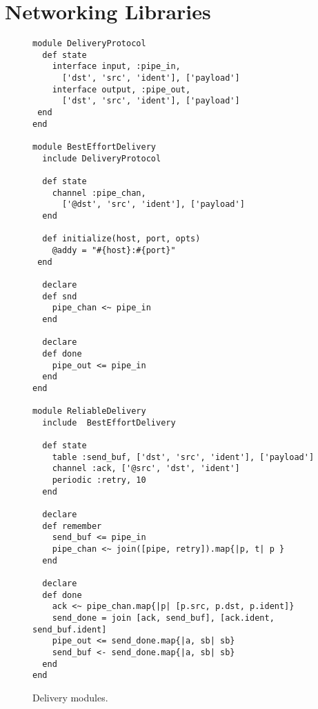 \section{Networking Libraries}
\label{app:network-code}

\begin{figure}[t]
\begin{scriptsize}
\begin{lstlisting}
module DeliveryProtocol
  def state
    interface input, :pipe_in,
      ['dst', 'src', 'ident'], ['payload']
    interface output, :pipe_out,
      ['dst', 'src', 'ident'], ['payload']
 end
end

module BestEffortDelivery
  include DeliveryProtocol

  def state
    channel :pipe_chan,
      ['@dst', 'src', 'ident'], ['payload']
  end

  def initialize(host, port, opts)
    @addy = "#{host}:#{port}"
 end

  declare
  def snd
    pipe_chan <~ pipe_in
  end

  declare
  def done
    pipe_out <= pipe_in
  end
end

module ReliableDelivery
  include  BestEffortDelivery

  def state
    table :send_buf, ['dst', 'src', 'ident'], ['payload']
    channel :ack, ['@src', 'dst', 'ident']
    periodic :retry, 10
  end

  declare
  def remember
    send_buf <= pipe_in
    pipe_chan <~ join([pipe, retry]).map{|p, t| p }
  end

  declare
  def done
    ack <~ pipe_chan.map{|p| [p.src, p.dst, p.ident]}
    send_done = join [ack, send_buf], [ack.ident, send_buf.ident]
    pipe_out <= send_done.map{|a, sb| sb}
    send_buf <- send_done.map{|a, sb| sb}
  end
end
\end{lstlisting}
\centering
\vspace{-10pt}
\caption{Delivery modules.}
\label{fig:delivery-impl}
\end{scriptsize}
\vspace{-2pt}
\end{figure}


